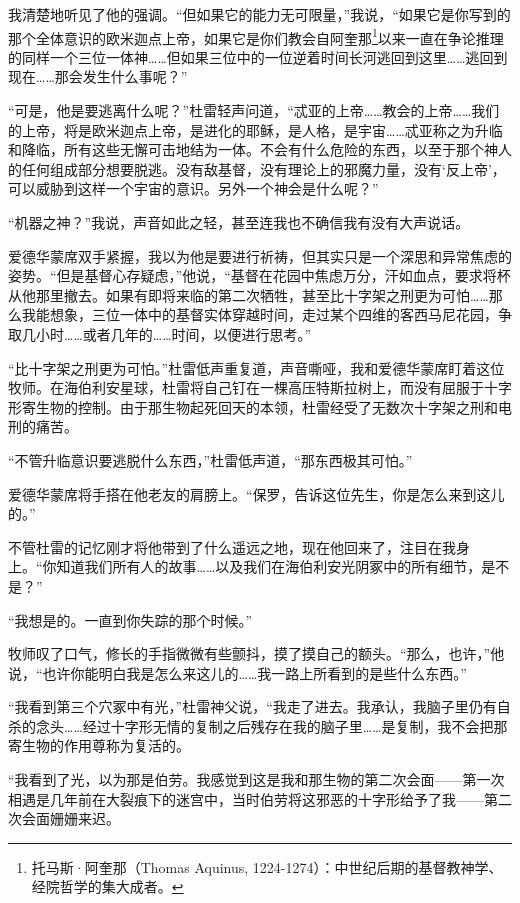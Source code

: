 \documentclass[AutoFakeBold=true]{book}
\begin{document}
我清楚地听见了他的强调。``但如果它的能力无可限量，''我说，``如果它是你写到的那个全体意识的欧米迦点上帝，如果它是你们教会自阿奎那\footnote{托马斯·阿奎那（Thomas Aquinus, 1224-1274）：中世纪后期的基督教神学、经院哲学的集大成者。}以来一直在争论推理的同样一个三位一体神……但如果三位中的一位逆着时间长河逃回到这里……逃回到现在……那会发生什么事呢？''

``可是，他是要逃离什么呢？''杜雷轻声问道，``忒亚的上帝……教会的上帝……我们的上帝，将是欧米迦点上帝，是进化的耶稣，是人格，是宇宙……忒亚称之为升临和降临，所有这些无懈可击地结为一体。不会有什么危险的东西，以至于那个神人的任何组成部分想要脱逃。没有敌基督，没有理论上的邪魔力量，没有`反上帝'，可以威胁到这样一个宇宙的意识。另外一个神会是什么呢？''

``机器之神？''我说，声音如此之轻，甚至连我也不确信我有没有大声说话。

爱德华蒙席双手紧握，我以为他是要进行祈祷，但其实只是一个深思和异常焦虑的姿势。``但是基督心存疑虑，''他说，``基督在花园中焦虑万分，汗如血点，要求将杯从他那里撤去。如果有即将来临的第二次牺牲，甚至比十字架之刑更为可怕……那么我能想象，三位一体中的基督实体穿越时间，走过某个四维的客西马尼花园，争取几小时……或者几年的……时间，以便进行思考。''

``比十字架之刑更为可怕。''杜雷低声重复道，声音嘶哑，我和爱德华蒙席盯着这位牧师。在海伯利安星球，杜雷将自己钉在一棵高压特斯拉树上，而没有屈服于十字形寄生物的控制。由于那生物起死回天的本领，杜雷经受了无数次十字架之刑和电刑的痛苦。

``不管升临意识要逃脱什么东西，''杜雷低声道，``那东西极其可怕。''

爱德华蒙席将手搭在他老友的肩膀上。``保罗，告诉这位先生，你是怎么来到这儿的。''

不管杜雷的记忆刚才将他带到了什么遥远之地，现在他回来了，注目在我身上。``你知道我们所有人的故事……以及我们在海伯利安光阴冢中的所有细节，是不是？''

``我想是的。一直到你失踪的那个时候。''

牧师叹了口气，修长的手指微微有些颤抖，摸了摸自己的额头。``那么，也许，''他说，``也许你能明白我是怎么来这儿的……我一路上所看到的是些什么东西。''

\vspace*{1em}

``我看到第三个穴冢中有光，''杜雷神父说，``我走了进去。我承认，我脑子里仍有自杀的念头……经过十字形无情的复制之后残存在我的脑子里……是复制，我不会把那寄生物的作用尊称为复活的。

``我看到了光，以为那是伯劳。我感觉到这是我和那生物的第二次会面——第一次相遇是几年前在大裂痕下的迷宫中，当时伯劳将这邪恶的十字形给予了我——第二次会面姗姗来迟。
\end{document}
